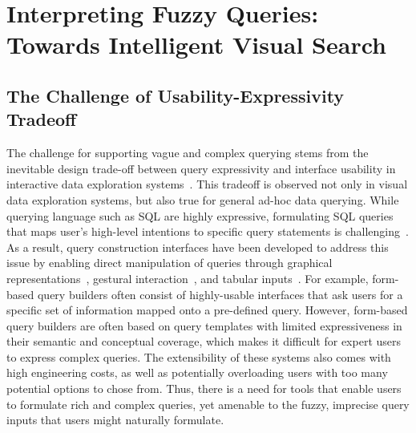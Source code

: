 \section{Interpreting Fuzzy Queries: Towards Intelligent Visual Search}\label{sec:vague}
\subsection{The Challenge of Usability-Expressivity Tradeoff}
\par The challenge for supporting vague and complex querying stems from the inevitable design trade-off between query expressivity and interface usability in interactive data exploration systems~\cite{Jagadish2007,Morton2014}. This tradeoff is observed not only in visual data exploration systems, but also true for general ad-hoc data querying. While querying language such as SQL are highly expressive, formulating SQL queries that maps user's high-level intentions to specific query statements is challenging~\cite{Jagadish2007,Khoussainova2010}. As a result, query construction interfaces have been developed to address this issue by enabling direct manipulation of queries through graphical representations~\cite{Abouzied2012}, gestural interaction~\cite{Nandi2013}, and tabular inputs~\cite{Zloof1975,Embley1989}. For example, form-based query builders often consist of highly-usable interfaces that ask users for a specific set of information mapped onto a pre-defined query. However, form-based query builders are often based on query templates with limited expressiveness in their semantic and conceptual coverage, which makes it difficult for expert users to express complex queries. The extensibility of these systems also comes with high engineering costs, as well as potentially overloading users with too many potential options to chose from. Thus, there is a need for tools that enable users to formulate rich and complex queries, yet amenable to the fuzzy, imprecise query inputs that users might naturally formulate. 

